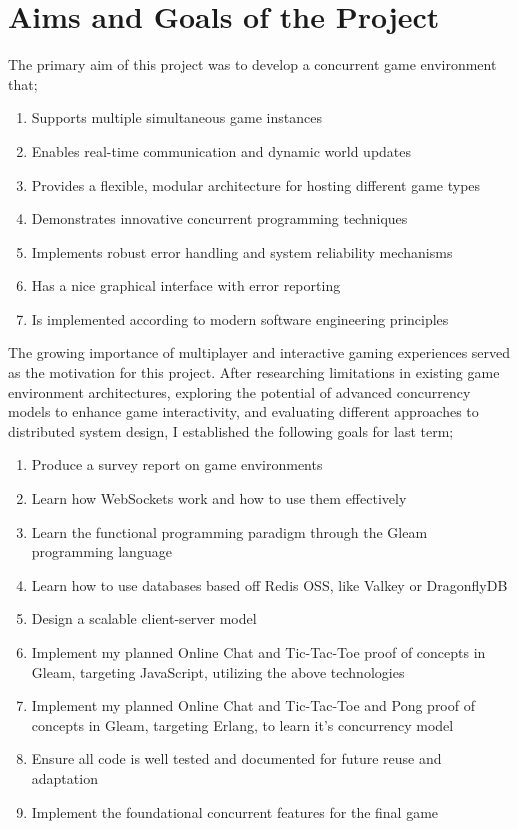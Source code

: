 \documentclass[]{final}
\begin{document}
\section{Aims and Goals of the Project}
The primary aim of this project was to develop a concurrent game environment that;
\begin{enumerate}
  \item Supports multiple simultaneous game instances
  \item Enables real-time communication and dynamic world updates
  \item Provides a flexible, modular architecture for hosting different game types
  \item Demonstrates innovative concurrent programming techniques
  \item Implements robust error handling and system reliability mechanisms
  \item Has a nice graphical interface with error reporting
  \item Is implemented according to modern software engineering principles
\end{enumerate}

\newpage

The growing importance of multiplayer and interactive gaming experiences served
as the motivation for this project. After researching limitations in existing
game environment architectures, exploring the potential of advanced
concurrency models to enhance game interactivity, and evaluating different
approaches to distributed system design, I established the following goals
for last term;

\begin{enumerate}
  \item Produce a survey report on game environments
  \item Learn how WebSockets work and how to use them effectively
  \item Learn the functional programming paradigm through the Gleam programming language
  \item Learn how to use databases based off Redis OSS, like Valkey or DragonflyDB
  \item Design a scalable client-server model
  \item Implement my planned Online Chat and Tic-Tac-Toe proof of concepts in Gleam, targeting JavaScript, utilizing the above technologies
  \item Implement my planned Online Chat and Tic-Tac-Toe and Pong proof of concepts in Gleam, targeting Erlang, to learn it's concurrency model
  \item Ensure all code is well tested and documented for future reuse and adaptation
  \item Implement the foundational concurrent features for the final game
\end{enumerate}
\end{document}
